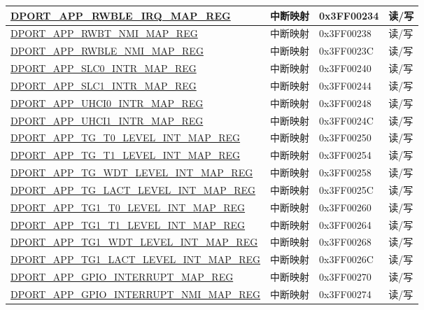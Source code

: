 \begin{longtable}{|L{8.2cm}|L{4.5cm}| l | l | }
\hyperref[regdesc:APPRWBLEIRQMAPREG]{DPORT\_APP\_RWBLE\_IRQ\_MAP\_REG} & 中断映射 & 0x3FF00234 & 读/写 \\ \hline
\hyperref[regdesc:APPRWBTNMIMAPREG]{DPORT\_APP\_RWBT\_NMI\_MAP\_REG} & 中断映射 & 0x3FF00238 & 读/写 \\ \hline
\hyperref[regdesc:APPRWBLENMIMAPREG]{DPORT\_APP\_RWBLE\_NMI\_MAP\_REG} & 中断映射 & 0x3FF0023C & 读/写 \\ \hline
\hyperref[regdesc:APPSLC0INTRMAPREG]{DPORT\_APP\_SLC0\_INTR\_MAP\_REG} & 中断映射 & 0x3FF00240 & 读/写 \\ \hline
\hyperref[regdesc:APPSLC1INTRMAPREG]{DPORT\_APP\_SLC1\_INTR\_MAP\_REG} & 中断映射 & 0x3FF00244 & 读/写 \\ \hline
\hyperref[regdesc:APPUHCI0INTRMAPREG]{DPORT\_APP\_UHCI0\_INTR\_MAP\_REG} & 中断映射 & 0x3FF00248 & 读/写 \\ \hline
\hyperref[regdesc:APPUHCI1INTRMAPREG]{DPORT\_APP\_UHCI1\_INTR\_MAP\_REG} & 中断映射 & 0x3FF0024C & 读/写 \\ \hline
\hyperref[regdesc:APPTGT0LEVELINTMAPREG]{DPORT\_APP\_TG\_T0\_LEVEL\_INT\_MAP\_REG} & 中断映射 & 0x3FF00250 & 读/写 \\ \hline
\hyperref[regdesc:APPTGT1LEVELINTMAPREG]{DPORT\_APP\_TG\_T1\_LEVEL\_INT\_MAP\_REG} & 中断映射 & 0x3FF00254 & 读/写 \\ \hline
\hyperref[regdesc:APPTGWDTLEVELINTMAPREG]{DPORT\_APP\_TG\_WDT\_LEVEL\_INT\_MAP\_REG} & 中断映射 & 0x3FF00258 & 读/写 \\ \hline
\hyperref[regdesc:APPTGLACTLEVELINTMAPREG]{DPORT\_APP\_TG\_LACT\_LEVEL\_INT\_MAP\_REG} & 中断映射 & 0x3FF0025C & 读/写 \\ \hline
\hyperref[regdesc:APPTG1T0LEVELINTMAPREG]{DPORT\_APP\_TG1\_T0\_LEVEL\_INT\_MAP\_REG} & 中断映射 & 0x3FF00260 & 读/写 \\ \hline
\hyperref[regdesc:APPTG1T1LEVELINTMAPREG]{DPORT\_APP\_TG1\_T1\_LEVEL\_INT\_MAP\_REG} & 中断映射 & 0x3FF00264 & 读/写 \\ \hline
\hyperref[regdesc:APPTG1WDTLEVELINTMAPREG]{DPORT\_APP\_TG1\_WDT\_LEVEL\_INT\_MAP\_REG} & 中断映射 & 0x3FF00268 & 读/写 \\ \hline
\hyperref[regdesc:APPTG1LACTLEVELINTMAPREG]{DPORT\_APP\_TG1\_LACT\_LEVEL\_INT\_MAP\_REG} & 中断映射 & 0x3FF0026C & 读/写 \\ \hline
\hyperref[regdesc:APPGPIOINTERRUPTMAPREG]{DPORT\_APP\_GPIO\_INTERRUPT\_MAP\_REG} & 中断映射 & 0x3FF00270 & 读/写 \\ \hline
\hyperref[regdesc:APPGPIOINTERRUPTNMIMAPREG]{DPORT\_APP\_GPIO\_INTERRUPT\_NMI\_MAP\_REG} & 中断映射 & 0x3FF00274 & 读/写 \\ \hline

\end{longtable}
